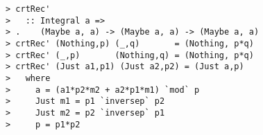 \documentclass[10pt]{article}
\begin{document}
\begin{verbatim}
> crtRec'
>   :: Integral a => 
> .    (Maybe a, a) -> (Maybe a, a) -> (Maybe a, a)
> crtRec' (Nothing,p) (_,q)       = (Nothing, p*q)
> crtRec' (_,p)       (Nothing,q) = (Nothing, p*q)
> crtRec' (Just a1,p1) (Just a2,p2) = (Just a,p)
>   where
>     a = (a1*p2*m2 + a2*p1*m1) `mod` p
>     Just m1 = p1 `inversep` p2 
>     Just m2 = p2 `inversep` p1
>     p = p1*p2
\end{verbatim}
\end{document}
